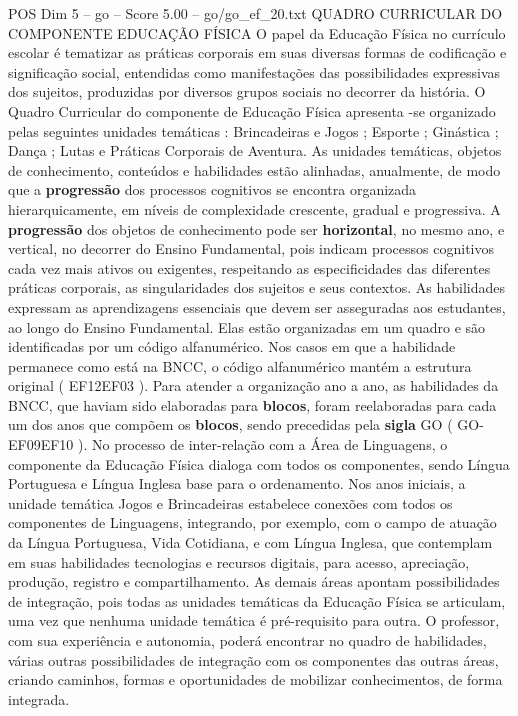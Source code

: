 \begin{textsample}{POS Dim 5 – go – Score 5.00 – go/go\_ef\_20.txt}  \label{ex:f5_pos_019}
QUADRO CURRICULAR DO COMPONENTE EDUCAÇÃO FÍSICA O papel da Educação Física no currículo escolar é tematizar as práticas corporais em suas diversas formas de codificação e significação social, entendidas como manifestações das possibilidades expressivas dos sujeitos, produzidas por diversos grupos sociais no decorrer da história.
O Quadro Curricular do componente de Educação Física apresenta -se organizado pelas seguintes unidades temáticas : Brincadeiras e Jogos ; Esporte ; Ginástica ; Dança ; Lutas e Práticas Corporais de Aventura.
As unidades temáticas, objetos de conhecimento, conteúdos e habilidades estão alinhadas, anualmente, de modo que a \textbf{progressão} dos processos cognitivos se encontra organizada hierarquicamente, em níveis de complexidade crescente, gradual e progressiva.
A \textbf{progressão} dos objetos de conhecimento pode ser \textbf{horizontal}, no mesmo ano, e vertical, no decorrer do Ensino Fundamental, pois indicam processos cognitivos cada vez mais ativos ou exigentes, respeitando as especificidades das diferentes práticas corporais, as singularidades dos sujeitos e seus contextos.
As habilidades expressam as aprendizagens essenciais que devem ser asseguradas aos estudantes, ao longo do Ensino Fundamental.
Elas estão organizadas em um quadro e são identificadas por um código alfanumérico.
Nos casos em que a habilidade permanece como está na BNCC, o código alfanumérico mantém a estrutura original ( EF12EF03 ).
Para atender a organização ano a ano, as habilidades da BNCC, que haviam sido elaboradas para \textbf{blocos}, foram reelaboradas para cada um dos anos que compõem os \textbf{blocos}, sendo precedidas pela \textbf{sigla} GO ( GO-EF09EF10 ).
No processo de inter-relação com a Área de Linguagens, o componente da Educação Física dialoga com todos os componentes, sendo Língua Portuguesa e Língua Inglesa base para o ordenamento.
Nos anos iniciais, a unidade temática Jogos e Brincadeiras estabelece conexões com todos os componentes de Linguagens, integrando, por exemplo, com o campo de atuação da Língua Portuguesa, Vida Cotidiana, e com Língua Inglesa, que contemplam em suas habilidades tecnologias e recursos digitais, para acesso, apreciação, produção, registro e compartilhamento.
As demais áreas apontam possibilidades de integração, pois todas as unidades temáticas da Educação Física se articulam, uma vez que nenhuma unidade temática é pré-requisito para outra.
O professor, com sua experiência e autonomia, poderá encontrar no quadro de habilidades, várias outras possibilidades de integração com os componentes das outras áreas, criando caminhos, formas e oportunidades de mobilizar conhecimentos, de forma integrada.

\end{textsample}

